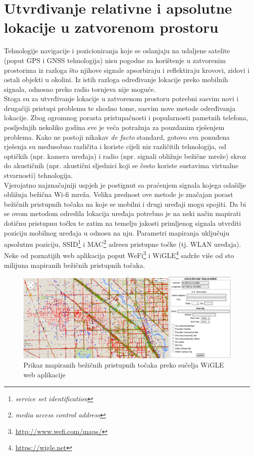 \chapter{Utvrđivanje relativne i apsolutne lokacije u zatvorenom prostoru}

Tehnologije navigacije i pozicioniranja koje se oslanjaju na udaljene satelite (poput GPS i GNSS tehnologija) nisu pogodne za korištenje u zatvorenim prostorima iz razloga što njihove signale apsorbiraju i reflektiraju krovovi, zidovi i ostali objekti u okolini. 
Iz istih razloga određivanje lokacije preko mobilnih signala, odnosno preko radio tornjeva nije moguće. 
\\
Stoga su za utvrđivanje lokacije u zatvorenom prostoru potrebni sasvim novi i drugačiji pristupi problemu te shodno tome, sasvim nove metode određivanja lokacije. 
Zbog ogromnog porasta pristupačnosti i popularnosti pametnih telefona, posljednjih nekoliko godina sve je veća potražnja za pouzdanim rješenjem problema. 
Kako ne postoji nikakav \textit{de facto} standard, gotovo sva ponuđena rješenja su međusobno različita i koriste cijeli niz različitih tehnologija, od optičkih (npr. kamera uređaja) i radio (npr. signali obližnje bežične mreže) skroz do akustičnih (npr. akustični sljednici koji se često koriste sustavima virtualne stvarnosti) tehnologija.
\\

Vjerojatno najznačajniji uspjeh je postignut sa praćenjem signala kojega odašilje obližnja bežična Wi-fi mreža. 
Velika prednost ove metode je značajan porast bežičnih pristupnih točaka na koje se mobilni i drugi uređaji mogu spojiti. 
Da bi se ovom metodom odredila lokacija uređaja potrebno je na neki način mapirati dotičnu pristupnu točku te zatim na temelju jakosti primljenog signala utvrditi poziciju mobilnog uređaja u odnosu na nju. 
Parametri mapiranja uključuju apsolutnu poziciju, SSID\footnote{\textit{service set identification}} i MAC\footnote{\textit{media access control address}} adresu pristupne točke (tj. WLAN uređaja). 
Neke od poznatijih web aplikacija poput WeFi\footnote{\url{http://www.wefi.com/maps/}} i WiGLE\footnote{\url{https://wigle.net}} sadrže više od sto milijuna mapiranih bežičnih pristupnih točaka. 
\\

\begin{figure}
    \centering
    \includegraphics[scale=0.3]{pictures/WiGLE}
    \caption{Prikaz mapiranih bežičnih pristupnih točaka preko sučelja WiGLE web aplikacije}    
\end{figure}


